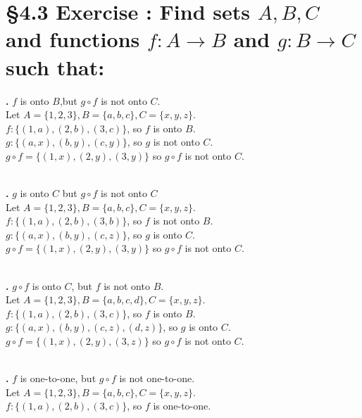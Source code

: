 \documentclass[a4paper,11pt]{article}
\begin{document}
\section*{\S 4.3 Exercise : Find sets \(A,B,C\) and functions \(f:A \rightarrow B\) and \(g:B \rightarrow C\) such that:}
\setcounter{SubsectionCounter}{1}
\textbf{.} \(f\) is onto 
\(B\),but \(g \circ f\) is not onto \(C\).\\
Let \(A = \{1,2,3\}, B=\{a,b,c\}, C=\{x,y,z\}\).\\
\(f:\{{(1,a)},{(2,b)},{(3,c)}\}\), so \(f\) is onto \(B\).\\
\(g:\{{(a,x)},{(b,y)},{(c,y)}\}\), so \(g\) is not onto \(C\).\\
\(g \circ f = \{{(1,x)},{(2,y)},{(3,y)}\}\) so \(g \circ f\) is not onto 
\(C\).\\
\\\addtocounter{SubsectionCounter}{1}
\noindent\textbf{.} \(g\) is onto 
\(C\) but \(g \circ f\) is not onto \(C\)\\
Let \(A = \{1,2,3\}, B=\{a,b,c\}, C=\{x,y,z\}\).\\
\(f:\{{(1,a)},{(2,b)},{(3,b)}\}\), so \(f\) is not onto \(B\).\\
\(g:\{{(a,x)},{(b,y)},{(c,z)}\}\), so \(g\) is onto \(C\).\\
\(g \circ f = \{{(1,x)},{(2,y)},{(3,y)}\}\) so \(g \circ f\) is not onto 
\(C\).\\
\\\addtocounter{SubsectionCounter}{1}
\noindent\textbf{.} \(g \circ f\) 
is onto \(C\), but \(f\) is not onto \(B\).\\
Let \(A = \{1,2,3\}, B=\{a,b,c,d\}, C=\{x,y,z\}\).\\
\(f:\{{(1,a)},{(2,b)},{(3,c)}\}\), so \(f\) is onto \(B\).\\
\(g:\{{(a,x)},{(b,y)},{(c,z)},{(d,z)}\}\), so \(g\) is onto \(C\).\\
\(g \circ f = \{{(1,x)},{(2,y)},{(3,z)}\}\) so \(g \circ f\) is not onto 
\(C\).\\
\\\addtocounter{SubsectionCounter}{1}
\noindent\textbf{.} \(f\) is 
one-to-one, but \(g \circ f\) is not one-to-one.\\
Let \(A = \{1,2,3\}, B=\{a,b,c\}, C=\{x,y,z\}\).\\
\(f:\{{(1,a)},{(2,b)},{(3,c)}\}\), so \(f\) is one-to-one.\\
\end{document}
